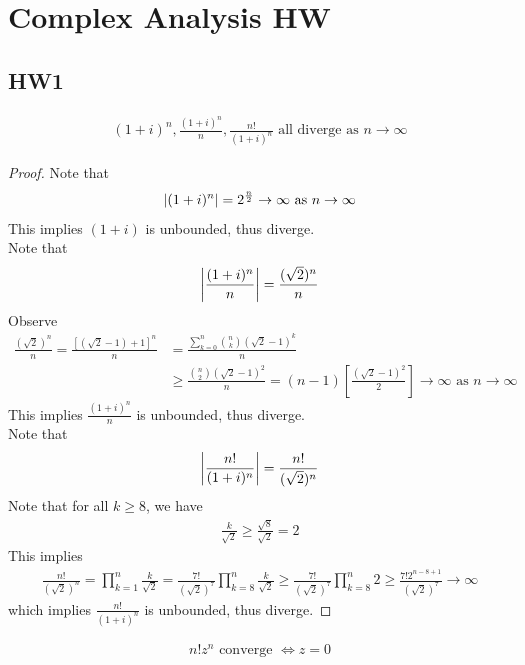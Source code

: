 \documentclass{report}
\begin{document}
\chapter{Complex Analysis HW}
\section{HW1}
\begin{theorem}
\begin{align*}
  (1+i)^n, \frac{(1+i)^n}{n},\frac{n!}{(1+i)^n}\text{ all diverge as }n\to \infty
\end{align*}
\begin{proof}
Note that 
\begin{align*}
\left|(1+i)^n\right|=2^{\frac{n}{2}}\to \infty\text{ as }n\to \infty
\end{align*}
This implies $(1+i)$ is unbounded, thus diverge.\\

Note that 
\begin{align*}
\left|\frac{(1+i)^n}{n}\right|=\frac{(\sqrt{2})^n}{n}
\end{align*}
Observe 
\begin{align*}
\frac{(\sqrt{2})^n}{n}= \frac{[(\sqrt{2}-1)+1]^n}{n}&=\frac{\sum_{k=0}^n \binom{n}{k}(\sqrt{2}-1)^k}{n}\\
&\geq \frac{\binom{n}{2}(\sqrt{2}-1 )^2}{n}=(n-1) [\frac{(\sqrt{2}-1 )^2}{2}]\to \infty\text{ as }n\to \infty
\end{align*}
This implies $\frac{(1+i)^n}{n}$ is unbounded, thus diverge. \\

Note that 
\begin{align*}
\left|\frac{n!}{(1+i)^n}\right|= \frac{n!}{(\sqrt{2})^n}
\end{align*}
Note that for all $k\geq 8$, we have 
\begin{align*}
\frac{k}{\sqrt{2}}\geq \frac{\sqrt{8}}{\sqrt{2}}=2
\end{align*}
This implies 
\begin{align*}
  \frac{n!}{(\sqrt{2})^n}=\prod_{k=1}^n \frac{k}{\sqrt{2}}= \frac{7!}{(\sqrt{2})^7}\prod_{k=8}^n \frac{k}{\sqrt{2}}\geq \frac{7!}{(\sqrt{2})^7}\prod_{k=8}^n 2\geq \frac{7!2^{n-8+1}}{(\sqrt{2})^7}\to \infty
\end{align*}
which implies $\frac{n!}{(1+i)^n}$ is unbounded, thus diverge.
\end{proof}
\end{theorem}
\begin{theorem}
  \begin{align*}
  n!z^n\text{ converge }\iff z=0
  \end{align*}
\end{theorem}
\end{document}
